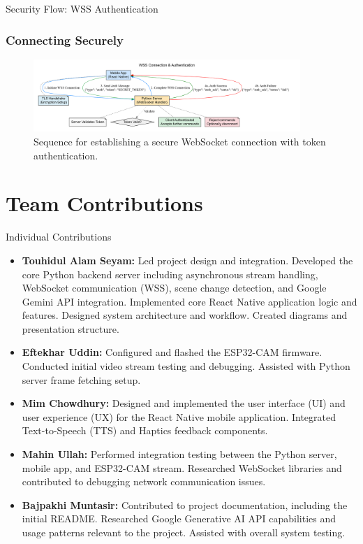 \documentclass{beamer}
\begin{document}
\begin{frame}{Security Flow: WSS Authentication}
    \frametitle{Connecting Securely}
     \begin{figure}
        \centering
        \includegraphics[width=0.9\textwidth, height=0.7\textheight, keepaspectratio]{Security_Flow_Diagram.png}
        \caption{Sequence for establishing a secure WebSocket connection with token authentication.}
    \end{figure}
\end{frame}


\section{Team Contributions}

\begin{frame}{Individual Contributions}
    \begin{itemize}
        \item \textbf{Touhidul Alam Seyam:} Led project design and integration. Developed the core Python backend server including asynchronous stream handling, WebSocket communication (WSS), scene change detection, and Google Gemini API integration. Implemented core React Native application logic and features. Designed system architecture and workflow. Created diagrams and presentation structure.

        \item \textbf{Eftekhar Uddin:} Configured and flashed the ESP32-CAM firmware. Conducted initial video stream testing and debugging. Assisted with Python server frame fetching setup.

        \item \textbf{Mim Chowdhury:} Designed and implemented the user interface (UI) and user experience (UX) for the React Native mobile application. Integrated Text-to-Speech (TTS) and Haptics feedback components.

        \item \textbf{Mahin Ullah:} Performed integration testing between the Python server, mobile app, and ESP32-CAM stream. Researched WebSocket libraries and contributed to debugging network communication issues.

        \item \textbf{Bajpakhi Muntasir:} Contributed to project documentation, including the initial README. Researched Google Generative AI API capabilities and usage patterns relevant to the project. Assisted with overall system testing.
    \end{itemize}
\end{frame}
\end{document}
